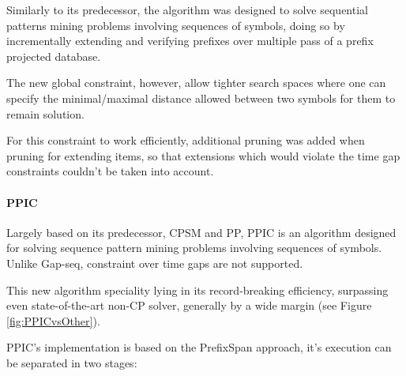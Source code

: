 \documentclass{eplmastersthesis}
\begin{document}
Similarly to its predecessor, the algorithm was designed to solve sequential patterns mining problems involving sequences of symbols, doing so by incrementally extending and verifying prefixes over multiple pass of a prefix projected database. \newline

The new global constraint, however, allow tighter search spaces where one can specify the minimal/maximal distance allowed between two symbols for them to remain solution. \newline

For this constraint to work efficiently, additional pruning was added when pruning for extending items, so that extensions which would violate the time gap constraints couldn't be taken into account.

\paragraph{PPIC}

Largely based on its predecessor, CPSM and PP, PPIC is an algorithm designed for solving sequence pattern mining problems involving sequences of symbols. Unlike Gap-seq, constraint over time gaps are not supported. \newline

This new algorithm speciality lying in its record-breaking efficiency, surpassing even state-of-the-art non-CP solver, generally by a wide margin (see Figure \ref{fig:PPICvsOther}).

PPIC's implementation is based on the PrefixSpan approach, it's execution can be separated in two stages:
\end{document}

